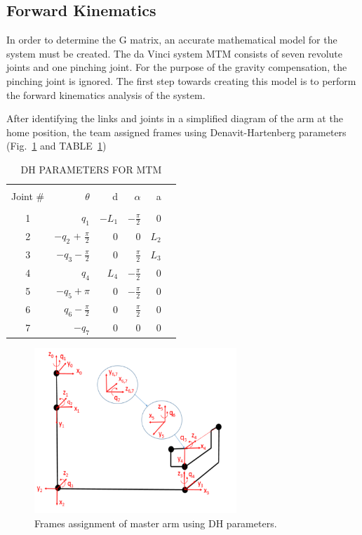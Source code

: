 \documentclass[conference]{IEEEtran}
\begin{document}
\subsection{Forward Kinematics}
In order to determine the G matrix, an accurate mathematical model for the system must be created. The da Vinci system MTM consists of seven revolute joints and one pinching joint. For the purpose of the gravity compensation, the pinching joint is ignored. The first step towards creating this model is to perform the forward kinematics analysis of the system.

After identifying the links and joints in a simplified diagram of the arm at the home position, the team assigned frames using Denavit-Hartenberg parameters (Fig.~\ref{dh_parameters} and TABLE~\ref{tab:dh_parameters_table})


\begin{table}[h]
\caption{DH PARAMETERS FOR MTM} %
\centering %
\begin{tabular}{c rrrrr} %
\hline\hline \\ %
Joint $\#$ & $\theta$ & d & $\alpha$ & a \\ [0.5ex]
\hline \\%
1 & $q_1$ 					 & $-L_1$& $-\frac{\pi}{2}$ & 0 \\ [1ex]
2 & $-q_2$ + $\frac{\pi}{2}$ & 0 	 & 0                & $L_2$ \\[1ex]
3 & $-q_3 - \frac{\pi}{2}$   & 0 	 & $\frac{\pi}{2}$  & $L_3$ \\[1ex]
4 & $q_4$ 					 & $L_4$ & $-\frac{\pi}{2}$ & 0 \\ [1ex]
5 & $-q_5 + \pi$ 			 & 0     & $-\frac{\pi}{2}$ & 0 \\ [1ex]
6 & $q_6 - \frac{\pi}{2}$ 	 & 0     & $\frac{\pi}{2}$   & 0  \\ [1ex]
7 & $-q_7$   				 & 0     & 0 				& 0  \\ [1ex] %
\hline
\end{tabular}
\label{tab:dh_parameters_table}
\end{table}

\begin{figure}[!t]
\centering
\includegraphics[width=3.0in]{dh_parameters}
\caption{Frames assignment of master arm using DH parameters.}
\label{dh_parameters}
\end{figure}
\end{document}
